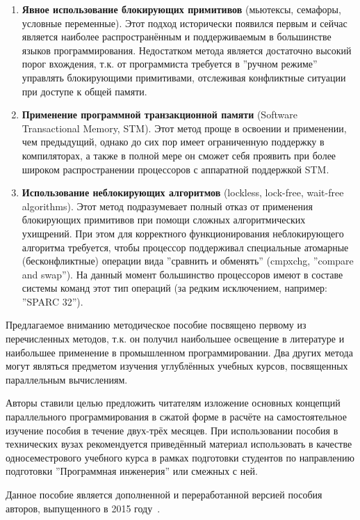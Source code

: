 \begin{enumerate}
    \sloppy
    \item\textbf{Явное использование блокирующих примитивов} (мьютексы, семафоры, условные переменные). Этот подход исторически появился первым и сейчас является наиболее распространённым и поддерживаемым в большинстве языков программирования. Недостатком метода является достаточно высокий порог вхождения, т.к. от программиста требуется в ''ручном режиме'' управлять блокирующими примитивами, отслеживая конфликтные ситуации при доступе к общей памяти.
    \item\textbf{Применение программной транзакционной памяти} (Software Transactional Memory, STM). Этот метод проще в освоении и применении, чем предыдущий, однако до сих пор имеет ограниченную поддержку в компиляторах, а также в полной мере он сможет себя проявить при более широком распространении процессоров с аппаратной поддержкой STM.
    \item\textbf{Использование неблокирующих алгоритмов} (lockless, lock-free, wait-free algorithms). Этот метод подразумевает полный отказ от применения блокирующих примитивов при помощи сложных алгоритмических ухищрений. При этом для корректного функционирования неблокирующего алгоритма требуется, чтобы процессор поддерживал специальные атомарные (бесконфликтные) операции вида ''сравнить и обменять'' (cmpxchg, ''compare and swap''). На данный момент большинство процессоров имеют в составе системы команд этот тип операций (за редким исключением, например: ''SPARC 32'').
\end{enumerate}

Предлагаемое вниманию методическое пособие посвящено первому из перечисленных методов, т.к. он получил наибольшее освещение в литературе и наибольшее применение в промышленном программировании. Два других метода могут являться предметом изучения углублённых учебных курсов, посвященных параллельным вычислениям.

Авторы ставили целью предложить читателям изложение основных концепций параллельного программирования в сжатой форме в расчёте на самостоятельное изучение пособия в течение двух-трёх месяцев. При использовании пособия в технических вузах рекомендуется приведённый материал использовать в качестве односеместрового учебного курса в рамках %
подготовки студентов по направлению подготовки ''Программная инженерия'' или смежных с ней.%

Данное пособие является дополненной и переработанной версией пособия авторов, выпущенного в 2015 году~\cite{SosninBalakshin2015}.